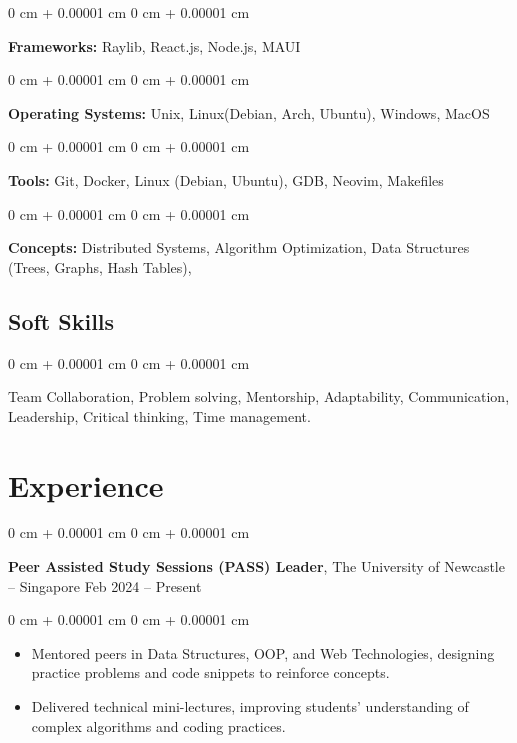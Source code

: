 \documentclass[10pt, letterpaper]{article}
\newenvironment{highlights}{
    \begin{itemize}[
        topsep=0.10 cm,
        parsep=0.10 cm,
        partopsep=0pt,
        itemsep=0pt,
        leftmargin=0 cm + 10pt
    ]
}{
    \end{itemize}
} %
\newenvironment{onecolentry}{
    \begin{adjustwidth}{
        0 cm + 0.00001 cm
    }{
        0 cm + 0.00001 cm
    }
}{
    \end{adjustwidth}
} %
\newenvironment{twocolentry}[2][]{
    \onecolentry
    \def\secondColumn{#2}
    \setcolumnwidth{\fill, 4.5 cm}
    \begin{paracol}{2}
}{
    \switchcolumn \raggedleft \secondColumn
    \end{paracol}
    \endonecolentry
} %
\begin{document}
\vspace{0.1 cm}

\begin{onecolentry}
    \textbf{Frameworks:} Raylib, React.js, Node.js, MAUI
\end{onecolentry}

\vspace{0.1 cm}

\begin{onecolentry}
    \textbf{Operating Systems:} Unix, Linux(Debian, Arch, Ubuntu), Windows, MacOS
\end{onecolentry}

\vspace{0.1 cm}

\begin{onecolentry}
    \textbf{Tools:} Git, Docker, Linux (Debian, Ubuntu), GDB, Neovim, Makefiles
\end{onecolentry}

\vspace{0.1 cm}

\begin{onecolentry}
    \textbf{Concepts:} Distributed Systems, Algorithm Optimization, Data Structures (Trees, Graphs, Hash Tables),
\end{onecolentry}

\subsection*{Soft Skills}
\begin{onecolentry}
    Team Collaboration, Problem solving, Mentorship, Adaptability, Communication, Leadership, Critical thinking, Time management.
\end{onecolentry}

        \section{Experience}        
                \begin{twocolentry}{
                    Feb 2024 – Present
                }
                    \textbf{Peer Assisted Study Sessions (PASS) Leader}, The University of Newcastle -- Singapore \end{twocolentry}
                \vspace{0.10 cm}
                \begin{onecolentry}
                    \begin{highlights}
                        \item Mentored peers in Data Structures, OOP, and Web Technologies, designing practice problems and code snippets to reinforce concepts.
                        \item Delivered technical mini-lectures, improving students’ understanding of complex algorithms and coding practices.
                    \end{highlights}
                \end{onecolentry}
                
\end{document}

